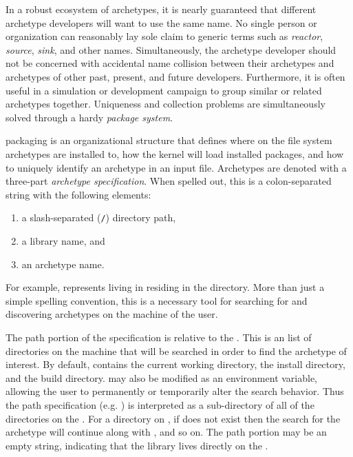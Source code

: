 In a robust ecosystem of archetypes, it is nearly guaranteed that different archetype
developers will want to use the same name. No single person or organization can 
reasonably lay sole claim to generic terms such as \emph{reactor}, \emph{source}, 
\emph{sink}, and other names. Simultaneously, the archetype developer should not 
be concerned with accidental name collision between their archetypes and archetypes
of other
past, present, and future developers.  Furthermore, it is often useful in a 
simulation or 
development campaign to group similar or related archetypes together. Uniqueness
and collection problems are simultaneously solved through a hardy \emph{package system}.

\cyclus packaging is an organizational structure that defines where on the file system 
archetypes are installed to, how the \cyclus kernel will load installed
packages, and how to uniquely identify an archetype in an input file.  Archetypes 
are denoted with a three-part \emph{archetype specification}. When spelled out, this
is a colon-separated string with the following elements:
\begin{enumerate}
    \item a slash-separated (\texttt{/}) directory path,
    \item a library name, and
    \item an archetype name.
\end{enumerate}
For example,  represents  living
in  residing in the  directory. More than just 
a simple spelling convention, this is a necessary
tool for searching for and discovering archetypes on the machine of the user.

The path portion of the specification is relative to the . This is 
an list of directories on the machine that will be searched in order to find the 
archetype of interest. By default,  contains the current working 
directory, the \cyclus install directory, and the \cyclus build directory. 
 may also be modified as an environment variable, allowing the user
to permanently or temporarily alter the \cyclus search behavior.  Thus the path 
specification (e.g. ) is interpreted as a sub-directory of all of 
the directories on the . For a directory  on 
, if   does not exist then the search for 
the archetype will continue along with , and so on. The path portion 
may be an empty string, indicating that the library lives directly on the 
.

